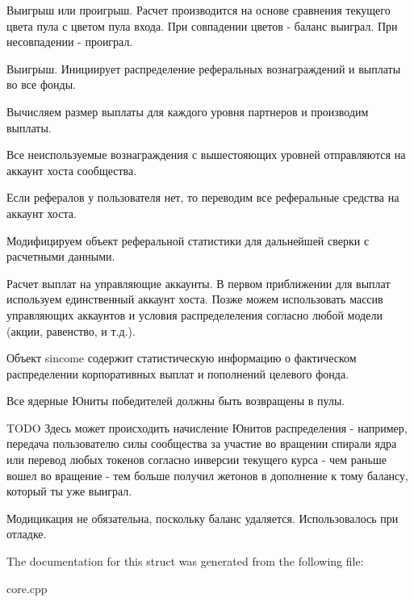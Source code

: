 Выигрыш или проигрыш. Расчет производится на основе сравнения текущего цвета пула с цветом пула входа. При совпадении цветов -\/ баланс выиграл. При несовпадении -\/ проиграл.

Выигрыш. Инициирует распределение реферальных вознаграждений и выплаты во все фонды.

Вычисляем размер выплаты для каждого уровня партнеров и производим выплаты.

Все неиспользуемые вознаграждения с вышестояющих уровней отправляются на аккаунт хоста сообщества.

Если рефералов у пользователя нет, то переводим все реферальные средства на аккаунт хоста.

Модифицируем объект реферальной статистики для дальнейшей сверки с расчетными данными.

Расчет выплат на управляющие аккаунты. В первом приближении для выплат используем единственный аккаунт хоста. Позже можем использовать массив управляющих аккаунтов и условия распределеления согласно любой модели (акции, равенство, и т.\+д.).

Объект sincome содержит статистическую информацию о фактическом распределении корпоративных выплат и пополнений целевого фонда.

Все ядерные Юниты победителей должны быть возвращены в пулы.

T\+O\+DO Здесь может происходить начисление Юнитов распределения -\/ например, передача пользователю силы сообщества за участие во вращении спирали ядра или перевод любых токенов согласно инверсии текущего курса -\/ чем раньше вошел во вращение -\/ тем больше получил жетонов в дополнение к тому балансу, который ты уже выиграл.

Модицикация не обязательна, поскольку баланс удаляется. Использовалось при отладке.

The documentation for this struct was generated from the following file\+:\begin{DoxyCompactItemize}
\item 
core.\+cpp\end{DoxyCompactItemize}
